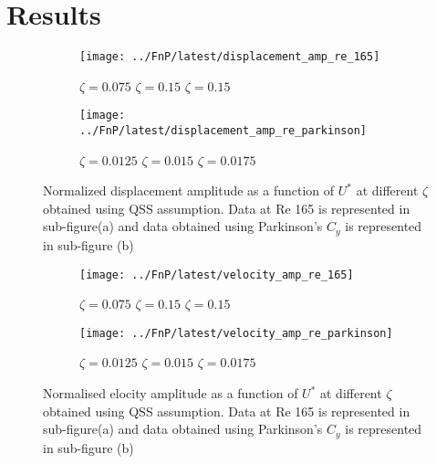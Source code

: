 
\section{Results}
\begin{figure}[h!]
\begin{subfigure}[b]{0.5\textwidth}
\centering
\label{fig:displacement_amp_re_165}
\texttt{[image: ../FnP/latest/displacement\_amp\_re\_165]}
\caption{\scriptsize {} $\zeta=0.075$  $\zeta=0.15$  $\zeta=0.15$ }
\end{subfigure}
\begin{subfigure}[b]{0.5\textwidth}
\centering
\label{fig:displacement_amp_re_parkinson}
\texttt{[image: ../FnP/latest/displacement\_amp\_re\_parkinson]}
\caption{\scriptsize {} $\zeta=0.0125$  $\zeta=0.015$  $\zeta=0.0175$}
\end{subfigure}
\caption{Normalized displacement amplitude as a function of $U^*$ at different $\zeta$ obtained using QSS assumption. Data at Re 165 is represented in sub-figure(a) and data obtained using Parkinson's  $C_y$ is represented in sub-figure (b) }
\label{fig:Displacement_amplitude}
\end{figure}
\begin{figure}[h!]
\begin{subfigure}[b]{0.53\textwidth}
\centering
\label{fig:velociy_amp_re_165}
\texttt{[image: ../FnP/latest/velocity\_amp\_re\_165]}
\caption{\scriptsize {} $\zeta=0.075$  $\zeta=0.15$  $\zeta=0.15$ }
\end{subfigure}
\begin{subfigure}[b]{0.5\textwidth}
\centering
\label{fig:velocity_amp_re_parkinson}
\texttt{[image: ../FnP/latest/velocity\_amp\_re\_parkinson]}
\caption{\scriptsize {} $\zeta=0.0125$  $\zeta=0.015$  $\zeta=0.0175$ }
\end{subfigure}
\caption{Normalised elocity amplitude as a function of $U^*$ at different $\zeta$ obtained using QSS assumption. Data at Re 165 is represented in sub-figure(a) and data obtained using Parkinson's  $C_y$ is represented in sub-figure (b)}
\label{fig:velocity_amplitude}
\end{figure}
